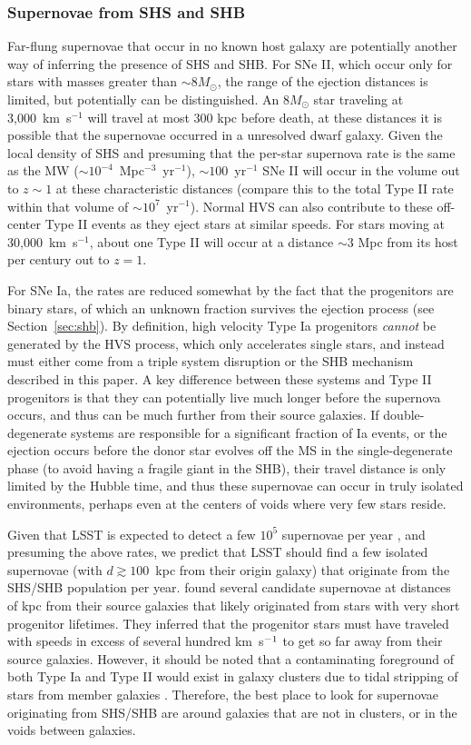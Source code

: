\documentclass[a4paper,twocolumn]{emulateapj}
\begin{document}
{\subsubsection{Supernovae from SHS and SHB}
Far-flung supernovae that occur in no known host galaxy are potentially another way of inferring the presence of SHS and SHB. For SNe II, which occur only for stars with masses greater than $\sim 8 M_{\odot}$, the range of the ejection distances is limited, but potentially can be distinguished. An $8 M_{\odot}$ star traveling at 3,000~km~s$^{-1}$ will travel at most 300 kpc before death, at these distances it is possible that the supernovae occurred in a unresolved dwarf galaxy. Given the local density of SHS and presuming that the per-star supernova rate is the same as the MW ($\sim 10^{-4}$~Mpc$^{-3}$~yr$^{-1}$), $\sim 100$~yr$^{-1}$ SNe II will occur in the volume out to $z \sim 1$ at these characteristic distances (compare this to the total Type II rate within that volume of $\sim 10^{7}$~yr$^{-1}$). Normal HVS can also contribute to these off-center Type II events as they eject stars at similar speeds. For stars moving at 30,000~km~s$^{-1}$, about one Type II will occur at a distance $\sim 3$ Mpc from its host per century out to $z = 1$.

For SNe Ia, the rates are reduced somewhat by the fact that the progenitors are binary stars, of which an unknown fraction survives the ejection process (see Section~\ref{sec:shb}). By definition, high velocity Type Ia progenitors {\it cannot} be generated by the HVS process, which only accelerates single stars, and instead must either come from a triple system disruption or the SHB mechanism described in this paper. A key difference between these systems and Type II progenitors is that they can potentially live much longer before the supernova occurs, and thus can be much further from their source galaxies. If double-degenerate systems are responsible for a significant fraction of Ia events, or the ejection occurs before the donor star evolves off the MS in the single-degenerate phase (to avoid having a fragile giant in the SHB), their travel distance is only limited by the Hubble time, and thus these supernovae can occur in truly isolated environments, perhaps even at the centers of voids where very few stars reside.

Given that LSST is expected to detect a few $10^{5}$ supernovae per year \citep{Abell:2009a}, and presuming the above rates, we predict that LSST should find a few isolated supernovae (with $d \gtrsim 100$~kpc from their origin galaxy) that originate from the SHS/SHB population per year. \citet{Zinn:2011a} found several candidate supernovae at distances of kpc from their source galaxies that likely originated from stars with very short progenitor lifetimes. They inferred that the progenitor stars must have traveled with speeds in excess of several hundred km~s$^{\smash{-1}}$ to get so far away from their source galaxies. However, it should be noted that a contaminating foreground of both Type Ia and Type II would exist in galaxy clusters due to tidal stripping of stars from member galaxies \citep{Maoz:2005a}. Therefore, the best place to look for supernovae originating from SHS/SHB are around galaxies that are not in clusters, or in the voids between galaxies.

}
\end{document}
